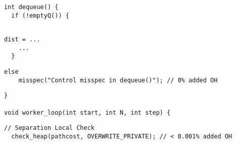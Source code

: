 

\begin{lstlisting}[morekeywords={pathcost,dist}, belowskip=0pt,
firstnumber=10, name=dij_checks, showlines=true]
int dequeue() {
  if (!emptyQ()) {


\end{lstlisting}

\begin{lstlisting}[morekeywords={pathcost,dist}, aboveskip=0pt, belowskip=0pt,
firstnumber=13, name=dij_checks]
    dist = ...
    ...
  }
\end{lstlisting}

  \begin{lstlisting}[morekeywords={pathcost}, aboveskip=0pt,belowskip=0pt,backgroundcolor=\color{lightgray}, firstnumber=auto, name=dij_checks]
  else
    misspec("Control misspec in dequeue()"); // 0% added OH
\end{lstlisting}

\begin{lstlisting}[morekeywords={pathcost,dist}, aboveskip=0pt, belowskip=0pt,
firstnumber=auto, name=dij_checks,showlines=true]
}

void worker_loop(int start, int N, int step) {

\end{lstlisting}

  \begin{lstlisting}[morekeywords={pathcost}, aboveskip=0pt,belowskip=0pt,backgroundcolor=\color{lightgray},
  firstnumber=auto, name=dij_checks,showlines=true]
  // Separation Local Check
  check_heap(pathcost, OVERWRITE_PRIVATE); // < 0.001% added OH
  \end{lstlisting}

